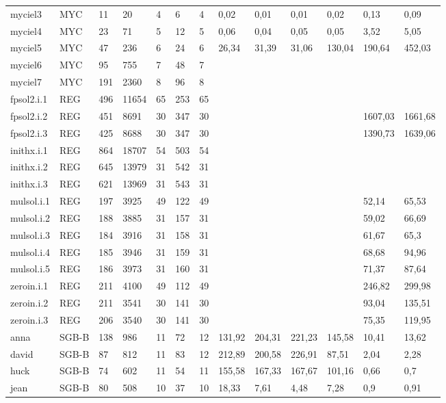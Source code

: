 \documentclass{sig-alternate}
\begin{document}
\begin{table*}[b]
{\begin{tabular}{lllllllllllll}
myciel3 & MYC & 11 & 20 & 4 & 6 & 4 & 0,02 & 0,01 & 0,01 & 0,02 & 0,13 & 0,09 \\
myciel4 & MYC & 23 & 71 & 5 & 12 & 5 & 0,06 & 0,04 & 0,05 & 0,05 & 3,52 & 5,05 \\
myciel5 & MYC & 47 & 236 & 6 & 24 & 6 & 26,34 & 31,39 & 31,06 & 130,04 & 190,64 & 452,03 \\
myciel6 & MYC & 95 & 755 & 7 & 48 & 7 &  &  &  &  &  &  \\
myciel7 & MYC & 191 & 2360 & 8 & 96 & 8 &  &  &  &  &  &  \\
fpsol2.i.1 & REG & 496 & 11654 & 65 & 253 & 65 &  &  &  &  &  &  \\
fpsol2.i.2 & REG & 451 & 8691 & 30 & 347 & 30 &  &  &  &  & 1607,03 & 1661,68 \\
fpsol2.i.3 & REG & 425 & 8688 & 30 & 347 & 30 &  &  &  &  & 1390,73 & 1639,06 \\
inithx.i.1 & REG & 864 & 18707 & 54 & 503 & 54 &  &  &  &  &  &  \\
inithx.i.2 & REG & 645 & 13979 & 31 & 542 & 31 &  &  &  &  &  &  \\
inithx.i.3 & REG & 621 & 13969 & 31 & 543 & 31 &  &  &  &  &  &  \\
mulsol.i.1 & REG & 197 & 3925 & 49 & 122 & 49 &  &  &  &  & 52,14 & 65,53 \\
mulsol.i.2 & REG & 188 & 3885 & 31 & 157 & 31 &  &  &  &  & 59,02 & 66,69 \\
mulsol.i.3 & REG & 184 & 3916 & 31 & 158 & 31 &  &  &  &  & 61,67 & 65,3 \\
mulsol.i.4 & REG & 185 & 3946 & 31 & 159 & 31 &  &  &  &  & 68,68 & 94,96 \\
mulsol.i.5 & REG & 186 & 3973 & 31 & 160 & 31 &  &  &  &  & 71,37 & 87,64 \\
zeroin.i.1 & REG & 211 & 4100 & 49 & 112 & 49 &  &  &  &  & 246,82 & 299,98 \\
zeroin.i.2 & REG & 211 & 3541 & 30 & 141 & 30 &  &  &  &  & 93,04 & 135,51 \\
zeroin.i.3 & REG & 206 & 3540 & 30 & 141 & 30 &  &  &  &  & 75,35 & 119,95 \\
anna & SGB-B & 138 & 986 & 11 & 72 & 12 & 131,92 & 204,31 & 221,23 & 145,58 & 10,41 & 13,62 \\
david & SGB-B & 87 & 812 & 11 & 83 & 12 & 212,89 & 200,58 & 226,91 & 87,51 & 2,04 & 2,28 \\
huck & SGB-B & 74 & 602 & 11 & 54 & 11 & 155,58 & 167,33 & 167,67 & 101,16 & 0,66 & 0,7 \\
jean & SGB-B & 80 & 508 & 10 & 37 & 10 & 18,33 & 7,61 & 4,48 & 7,28 & 0,9 & 0,91 \\

\end{tabular}}
\end{table*}
\end{document}
